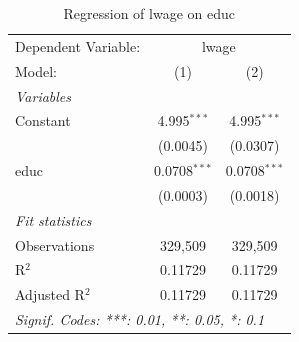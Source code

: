 
\begin{table}[htbp]
   \centering
   \begin{tabular}{lcc}
      \tabularnewline \midrule \midrule
      Dependent Variable: & \multicolumn{2}{c}{lwage}\\
      Model:         & (1)            & (2)\\  
      \midrule
      \emph{Variables}\\
      Constant       & 4.995$^{***}$  & 4.995$^{***}$\\   
      & (0.0045)       & (0.0307)\\   
      educ           & 0.0708$^{***}$ & 0.0708$^{***}$\\   
      & (0.0003)       & (0.0018)\\   
      \midrule
      \emph{Fit statistics}\\
      Observations   & 329,509        & 329,509\\  
      R$^2$          & 0.11729        & 0.11729\\  
      Adjusted R$^2$ & 0.11729        & 0.11729\\  
      \midrule \midrule
      \multicolumn{3}{l}{\emph{Signif. Codes: ***: 0.01, **: 0.05, *: 0.1}}\\
   \end{tabular}
   \caption{\label{tab:regression_problem_1_a} Regression of lwage on educ}
\end{table}


